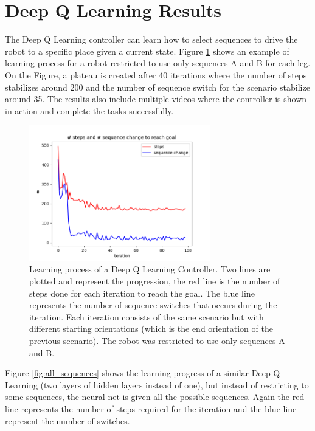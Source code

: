     \section{Deep Q Learning Results}\label{sec:res_qlearning}
        The Deep Q Learning controller can learn how to select sequences to drive the robot to a specific place given a current state. Figure \ref{fig:dqn_results} shows an example of learning process for a robot restricted to use only sequences A and B for each leg. On the Figure, a plateau is created after 40 iterations where the number of steps stabilizes around 200 and the number of sequence switch for the scenario stabilize around 35. The results also include multiple videos where the controller is shown in action and complete the tasks successfully.
        \begin{figure}[h]
            \centering
            \includegraphics[width=0.7\textwidth]{images/AB-0-FALSE.png}
            \caption{Learning process of a Deep Q Learning Controller. Two lines are plotted and represent the progression, the red line is the number of steps done for each iteration to reach the goal. The blue line represents the number of sequence switches that occurs during the iteration. Each iteration consists of the same scenario but with different starting orientations (which is the end orientation of the previous scenario). The robot was restricted to use only sequences A and B.}
            \label{fig:dqn_results}
        \end{figure}
        
        Figure \ref{fig:all_sequences} shows the learning progress of a similar Deep Q Learning (two layers of hidden layers instead of one), but instead of restricting to some sequences, the neural net is given all the possible sequences. Again the red line represents the number of steps required for the iteration and the blue line represent the number of switches.
        

